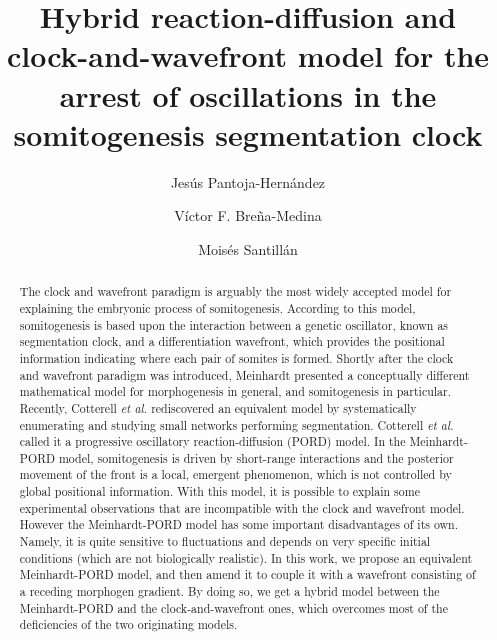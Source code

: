 \documentclass[%
 preprint,
 aip, 
 amsmath,amssymb,
]{revtex4-2}
\begin{document}
\title{Hybrid reaction-diffusion and clock-and-wavefront model for the arrest of oscillations in the somitogenesis segmentation clock}

\author{Jes\'us Pantoja-Hern\'andez}

\author{V\'ictor F. Bre\~na-Medina}

\author{Mois\'es Santill\'an}

\begin{abstract}
The clock and wavefront paradigm is arguably the most widely accepted model for explaining the embryonic process of somitogenesis. According to this model, somitogenesis is based upon the interaction between a genetic oscillator, known as segmentation clock, and a differentiation wavefront, which provides the positional information indicating where each pair of somites is formed. Shortly after the clock and wavefront paradigm was introduced, Meinhardt presented a conceptually different mathematical model for morphogenesis in general, and somitogenesis in particular. Recently, Cotterell \emph{et al.} rediscovered an equivalent model by systematically enumerating and studying small networks performing segmentation. Cotterell \emph{et al.} called it a progressive oscillatory reaction-diffusion (PORD) model. In the Meinhardt-PORD model, somitogenesis is driven by short-range interactions and the posterior movement of the front is a local, emergent phenomenon, which is not controlled by global positional information. With this model, it is possible to explain some experimental observations that are incompatible with the clock and wavefront model. However the Meinhardt-PORD model has some important disadvantages of its own. Namely, it is quite sensitive to fluctuations and depends on very specific initial conditions (which are not biologically realistic). In this work, we propose an equivalent Meinhardt-PORD model, and then amend it to couple it with a wavefront consisting of a receding morphogen gradient. By doing so, we get a hybrid model between the Meinhardt-PORD and the clock-and-wavefront ones, which overcomes most of the deficiencies of the two originating models.
\end{abstract}
	
\end{document}
